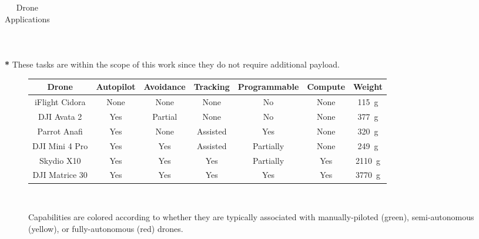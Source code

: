 \begin{table}
\begin{tabularx}{\textwidth}{| m{2.8cm} | m{12.5cm} |}
        \hline
    \end{tabularx}
    \\[0.2cm]
    \begin{captext}
        \small
        \textbf{*} These tasks are within the scope of this work since they do not require additional payload.
    \end{captext}
    \caption{Drone Applications}
    \label{tab:drone-apps}
\end{table}

\begin{figure}[]
    \centering
    \begin{tabular}{|c|c|c|c|c|c|c|}
        \hline
           \rowcolor{lightgray!50}
         \textbf{Drone} & \textbf{Autopilot} & \textbf{Avoidance} & \textbf{Tracking} & \textbf{Programmable} & \textbf{Compute} & \textbf{Weight} \\
         \hline
         iFlight Cidora & \cellcolor{green!20}None & \cellcolor{green!20}None & \cellcolor{green!20}None & \cellcolor{green!20}No & \cellcolor{green!20}None & 115~g \\[0.1cm]
         \hline
         DJI Avata 2 & \cellcolor{red!20}Yes & \cellcolor{yellow!20}Partial & \cellcolor{green!20}None & \cellcolor{green!20}No & \cellcolor{green!20}None & 377~g \\[0.1cm]
         \hline
         Parrot Anafi & \cellcolor{red!20}Yes & \cellcolor{green!20}None & \cellcolor{yellow!20}Assisted & \cellcolor{red!20}Yes & \cellcolor{green!20}None & 320~g \\[0.1cm]
         \hline
         DJI Mini 4 Pro & \cellcolor{red!20}Yes & \cellcolor{red!20}Yes & \cellcolor{yellow!20}Assisted & \cellcolor{yellow!20}Partially & \cellcolor{green!20}None & 249~g \\[0.1cm]
         \hline
         Skydio X10 & \cellcolor{red!20}Yes & \cellcolor{red!20}Yes & \cellcolor{red!20}Yes & \cellcolor{yellow!20}Partially & \cellcolor{red!20}Yes & 2110~g \\[0.1cm]
         \hline
         DJI Matrice 30 & \cellcolor{red!20}Yes & \cellcolor{red!20}Yes & \cellcolor{red!20}Yes & \cellcolor{red!20}Yes & \cellcolor{red!20}Yes & 3770~g \\[0.1cm]
         \hline
    \end{tabular}
    \\[0.2cm]
    \begin{captext}
        \small Capabilities are colored according to whether they are typically associated with manually-piloted (green), semi-autonomous (yellow), or fully-autonomous (red) drones.

\end{captext}
\end{figure}
